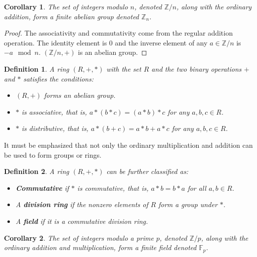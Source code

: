 \documentclass{ufsctex/ufsctex}
\newtheorem{definition}{Definition}
\newtheorem{corollary}{Corollary}
\begin{document}
\begin{corollary}
The set of integers modulo $n$, denoted $\mathbb{Z}/n$, along with the ordinary
addition, form a finite abelian group denoted $\mathbb{Z}_n$.
\end{corollary}

\begin{proof}
The associativity and commutativity come from the regular addition operation.
The identity element is $0$ and the inverse element of any $a \in \mathbb{Z}/n$
is $-a \mod n$. $(\mathbb{Z}/n, +)$ is an abelian group.
\end{proof}

\begin{definition}
A ring $(R, +, *)$ with the set $R$ and the two binary operations $+$ and $*$
satisfies the conditions:
\begin{itemize}
	\item $(R, +)$ forms an abelian group.
	\item $*$ is associative, that is, $a*(b*c) = (a*b)*c$ for any $a, b, c \in
	R$.
	\item $*$ is distributive, that is, $a*(b+c) = a*b + a*c$ for any $a, b, c
	\in R$.
\end{itemize}
\end{definition}

It must be emphasized that not only the ordinary multiplication and addition
can be used to form groups or rings.

\begin{definition}
A ring $(R, +, *)$ can be further classified as:
\begin{itemize}
	\item \textbf{Commutative} if $*$ is commutative, that is, $a*b = b*a$ for
	all $a, b \in R$.
	\item A \textbf{division ring} if the nonzero elements of $R$ form a group
	under $*$.
	\item A \textbf{field} if it is a commutative division ring.
\end{itemize}
\end{definition}

\begin{corollary}
The set of integers modulo a prime $p$, denoted $\mathbb{Z}/p$, along with the
ordinary addition and multiplication, form a finite field denoted
$\mathbb{F}_p$.
\end{corollary}
\end{document}
